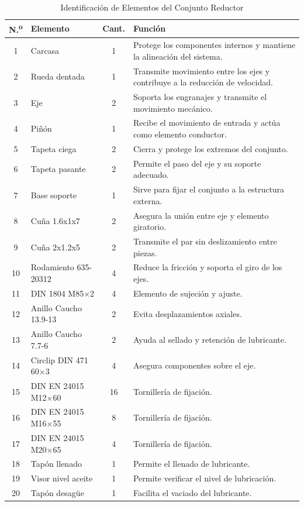 \documentclass[conference]{IEEEtran}
\begin{document}
\begin{table}[t]
\centering
\caption{Identificación de Elementos del Conjunto Reductor}
\label{tab:elementos-conjunto-reductor}
\small
\begin{tabular}{clcp{9cm}}
\hline
\textbf{N.\textsuperscript{o}} & \textbf{Elemento} & \textbf{Cant.} & \textbf{Función} \\
\hline
1  & Carcasa               & 1  & Protege los componentes internos y mantiene la alineación del sistema. \\
2  & Rueda dentada         & 1  & Transmite movimiento entre los ejes y contribuye a la reducción de velocidad. \\
3  & Eje                   & 2  & Soporta los engranajes y transmite el movimiento mecánico. \\
4  & Piñón                 & 1  & Recibe el movimiento de entrada y actúa como elemento conductor. \\
5  & Tapeta ciega          & 2  & Cierra y protege los extremos del conjunto. \\
6  & Tapeta pasante        & 2  & Permite el paso del eje y su soporte adecuado. \\
7  & Base soporte          & 1  & Sirve para fijar el conjunto a la estructura externa. \\
8  & Cuña 1.6x1x7  & 2  & Asegura la unión entre eje y elemento giratorio. \\
9  & Cuña 2x1.2x5  & 2  & Transmite el par sin deslizamiento entre piezas. \\
10 & Rodamiento 635-20312  & 4  & Reduce la fricción y soporta el giro de los ejes. \\
11 & DIN 1804 M85×2        & 4  & Elemento de sujeción y ajuste. \\
12 & Anillo Caucho 13.9-13   & 2  & Evita desplazamientos axiales. \\
13 & Anillo Caucho 7.7-6  & 2  & Ayuda al sellado y retención de lubricante. \\
14 & Circlip DIN 471 60×3  & 4  & Asegura componentes sobre el eje. \\
15 & DIN EN 24015 M12×60   & 16 & Tornillería de fijación. \\
16 & DIN EN 24015 M16×55   & 8  & Tornillería de fijación. \\
17 & DIN EN 24015 M20×65   & 4  & Tornillería de fijación. \\
18 & Tapón llenado   & 1  & Permite el llenado de lubricante. \\
19 & Visor nivel aceite  & 1 & Permite verificar el nivel de lubricación. \\
20 & Tapón desagüe  & 1  & Facilita el vaciado del lubricante. \\
\hline
\end{tabular}
\end{table}
\end{document}
